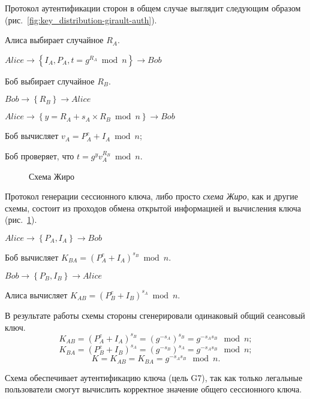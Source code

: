 Протокол аутентификации сторон в общем случае выглядит следующим образом (рис.~\ref{fig:key_distribution-girault-auth}).

\begin{protocol}
    \item[(1)] Алиса выбирает случайное $R_A$.
    \item[{}] $Alice \to \left\{ I_A, P_A, t = g^{R_A} \bmod n \right\} \to Bob$
    \item[(2)] Боб выбирает случайное $R_B$.
    \item[{}] $Bob \to \left\{ R_B \right\} \to Alice$
    \item[(3)] $Alice \to \left\{ y = R_A + s_A \times R_B \bmod n \right\} \to Bob$
    \item[(4)] Боб вычисляет $v_A = P_A^e + I_A \bmod n $;
    \item[{}] Боб проверяет, что $t = g^ y v_A^{R_B} \bmod n$.
\end{protocol}

\begin{figure}
	\centering
	\begin{sequencediagram}

	\end{sequencediagram}
	\caption{Схема Жиро\label{fig:key_distribution-girault-scheme}}
\end{figure}

Протокол генерации сессионного ключа, либо просто \emph{схема Жиро}, как и другие схемы, состоит из проходов обмена открытой информацией и вычисления ключа (рис.~\ref{fig:key_distribution-girault-scheme}).

\begin{protocol}
    \item[(1)] $Alice \to \left\{ P_A, I_A \right\} \to Bob$
    \item[(2)] Боб вычисляет $K_{BA} = (P_A^e + I_A)^{s_B} \bmod n$.
    \item[{}] $Bob \to \left\{ P_B, I_B \right\} \to Alice$
    \item[(3)] Алиса вычисляет $K_{AB} = (P_B^e + I_B)^{s_A} \bmod n$.
\end{protocol}

В результате работы схемы стороны сгенерировали одинаковый общий сеансовый ключ.
\[ K_{AB} = (P_A^e + I_A)^{s_B} = (g^{-s_A})^{s_B} = g^{-s_As_B} \mod n; \]
\[ K_{BA} = (P_B^e + I_B)^{s_A} = (g^{-s_B})^{s_A} = g^{-s_As_B} \mod n; \]
            \[ K = K_{AB} = K_{BA} = g^{-s_As_B} \mod n. \]

Схема обеспечивает аутентификацию ключа (цель G7), так как только легальные пользователи смогут вычислить корректное значение общего сессионного ключа.

